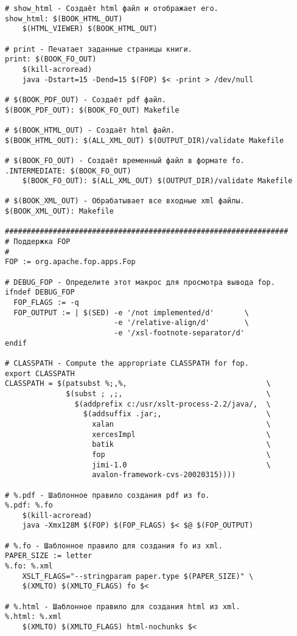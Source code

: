 \begin{verbatim}
# show_html - Создаёт html файл и отображает его.
show_html: $(BOOK_HTML_OUT)
    $(HTML_VIEWER) $(BOOK_HTML_OUT)

# print - Печатает заданные страницы книги.
print: $(BOOK_FO_OUT)
    $(kill-acroread)
    java -Dstart=15 -Dend=15 $(FOP) $< -print > /dev/null

# $(BOOK_PDF_OUT) - Создаёт pdf файл.
$(BOOK_PDF_OUT): $(BOOK_FO_OUT) Makefile

# $(BOOK_HTML_OUT) - Создаёт html файл.
$(BOOK_HTML_OUT): $(ALL_XML_OUT) $(OUTPUT_DIR)/validate Makefile

# $(BOOK_FO_OUT) - Создаёт временный файл в формате fo.
.INTERMEDIATE: $(BOOK_FO_OUT)
    $(BOOK_FO_OUT): $(ALL_XML_OUT) $(OUTPUT_DIR)/validate Makefile

# $(BOOK_XML_OUT) - Обрабатывает все входные xml файлы.
$(BOOK_XML_OUT): Makefile

#################################################################
# Поддержка FOP
#
FOP := org.apache.fop.apps.Fop

# DEBUG_FOP - Определите этот макрос для просмотра вывода fop.
ifndef DEBUG_FOP
  FOP_FLAGS := -q
  FOP_OUTPUT := | $(SED) -e '/not implemented/d'       \
                         -e '/relative-align/d'        \
                         -e '/xsl-footnote-separator/d'
endif

# CLASSPATH - Compute the appropriate CLASSPATH for fop.
export CLASSPATH
CLASSPATH = $(patsubst %;,%,                                \
              $(subst ; ,;,                                 \
                $(addprefix c:/usr/xslt-process-2.2/java/,  \
                  $(addsuffix .jar;,                        \
                    xalan                                   \
                    xercesImpl                              \
                    batik                                   \
                    fop                                     \
                    jimi-1.0                                \
                    avalon-framework-cvs-20020315))))

# %.pdf - Шаблонное правило создания pdf из fo.
%.pdf: %.fo
    $(kill-acroread)
    java -Xmx128M $(FOP) $(FOP_FLAGS) $< $@ $(FOP_OUTPUT)

# %.fo - Шаблонное правило для создания fo из xml.
PAPER_SIZE := letter
%.fo: %.xml
    XSLT_FLAGS="--stringparam paper.type $(PAPER_SIZE)" \
    $(XMLTO) $(XMLTO_FLAGS) fo $<

# %.html - Шаблонное правило для создания html из xml.
%.html: %.xml
    $(XMLTO) $(XMLTO_FLAGS) html-nochunks $<


\end{verbatim}
